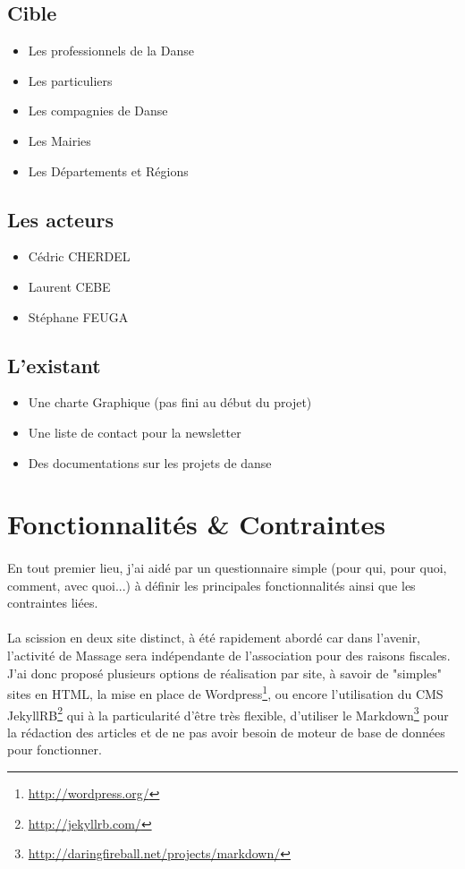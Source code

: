 \documentclass[11pt,a4paper]{report}
\begin{document}
		\subsection{Cible}
			\begin{itemize}
				\item Les professionnels de la Danse
				\item Les particuliers
				\item Les compagnies de Danse
				\item Les Mairies
				\item Les Départements et Régions
			\end{itemize}
		\subsection{Les acteurs}
			\begin{itemize}
				\item Cédric CHERDEL
				\item Laurent CEBE
				\item Stéphane FEUGA
			\end{itemize}
		\subsection{L'existant}
			\begin{itemize}
				\item Une charte Graphique (pas fini au début du projet)
				\item Une liste de contact pour la newsletter
				\item Des documentations sur les projets de danse
			\end{itemize}
	\section{Fonctionnalités \& Contraintes}
		\paragraph*{}En tout premier lieu, j'ai aidé par un questionnaire simple (pour qui, pour quoi, comment, avec quoi...) à définir les principales fonctionnalités ainsi que les contraintes liées.
		\paragraph*{}La scission en deux site distinct, à été rapidement abordé car dans l'avenir, l'activité de Massage sera indépendante de l'association pour des raisons fiscales. J'ai donc proposé plusieurs options de réalisation par site, à savoir de "simples" sites en HTML, la mise en place de Wordpress\footnote{\url{http://wordpress.org/}}, ou encore l'utilisation du CMS JekyllRB\footnote{\url{http://jekyllrb.com/}} qui à la particularité d'être très flexible, d'utiliser le Markdown\footnote{\url{http://daringfireball.net/projects/markdown/}} pour la rédaction des articles et de ne pas avoir besoin de moteur de base de données pour fonctionner.
\end{document}
